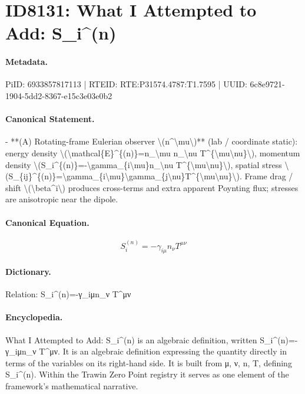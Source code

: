 \section*{ID8131: What I Attempted to Add: S\_i\textasciicircum{}(n)}
\paragraph{Metadata.}
PiID: 6933857817113 | RTEID: RTE:P31574.4787:T1.7595 | UUID: 6c8e9721-1904-5dd2-8367-e15c3e03e0b2

\paragraph{Canonical Statement.}
- **(A) Rotating-frame Eulerian observer \textbackslash{}(n\textasciicircum{}\textbackslash{}mu\textbackslash{})** (lab / coordinate static): energy density \textbackslash{}(\textbackslash{}mathcal\{E\}\textasciicircum{}\{(n)\}=n\_\textbackslash{}mu n\_\textbackslash{}nu T\textasciicircum{}\{\textbackslash{}mu\textbackslash{}nu\}\textbackslash{}), momentum density \textbackslash{}(S\_i\textasciicircum{}\{(n)\}=-\textbackslash{}gamma\_\{i\textbackslash{}mu\}n\_\textbackslash{}nu T\textasciicircum{}\{\textbackslash{}mu\textbackslash{}nu\}\textbackslash{}), spatial stress \textbackslash{}(S\_\{ij\}\textasciicircum{}\{(n)\}=\textbackslash{}gamma\_\{i\textbackslash{}mu\}\textbackslash{}gamma\_\{j\textbackslash{}nu\}T\textasciicircum{}\{\textbackslash{}mu\textbackslash{}nu\}\textbackslash{}). Frame drag / shift \textbackslash{}(\textbackslash{}beta\textasciicircum{}i\textbackslash{}) produces cross-terms and extra apparent Poynting flux; stresses are anisotropic near the dipole.

\paragraph{Canonical Equation.}
\[
S_i^{(n)}=-\gamma_{i\mu}n_\nu T^{\mu\nu}
\]

\paragraph{Dictionary.}
Relation: S\_i\textasciicircum{}(n)=-γ\_iμn\_ν T\textasciicircum{}μν

\paragraph{Encyclopedia.}
What I Attempted to Add: S\_i\textasciicircum{}(n) is an algebraic definition, written S\_i\textasciicircum{}(n)=-γ\_iμn\_ν T\textasciicircum{}μν. It is an algebraic definition expressing the quantity directly in terms of the variables on its right-hand side. It is built from μ, ν, n, T, defining S\_i\textasciicircum{}(n). Within the Trawin Zero Point registry it serves as one element of the framework's mathematical narrative.
